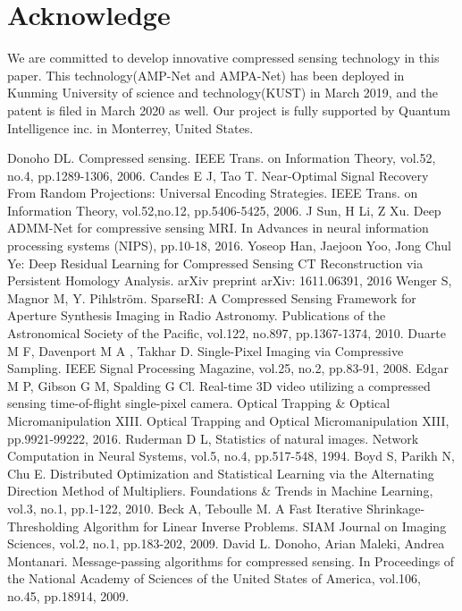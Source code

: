 \documentclass[conference]{IEEEtran}
\begin{document}
\section{Acknowledge}
We are committed to develop innovative compressed sensing technology in this paper. This technology(AMP-Net and AMPA-Net) has been deployed in Kunming University of science and technology(KUST) in March 2019, and the patent is filed in March 2020 as well. Our project is fully supported by Quantum Intelligence inc. in Monterrey, United States.
\begin{thebibliography}{1}
Donoho DL. Compressed sensing. IEEE Trans. on Information Theory, vol.52, no.4, pp.1289-1306, 2006.  
Candes E J, Tao T. Near-Optimal Signal Recovery From Random Projections: Universal Encoding Strategies. IEEE Trans. on Information Theory, vol.52,no.12, pp.5406-5425, 2006.
J Sun, H Li, Z Xu. Deep ADMM-Net for compressive sensing MRI. In Advances in neural information processing systems (NIPS), pp.10-18, 2016.
Yoseop Han, Jaejoon Yoo, Jong Chul Ye: Deep Residual Learning for Compressed Sensing CT Reconstruction via Persistent Homology Analysis. arXiv preprint arXiv: 1611.06391, 2016  
Wenger S, Magnor M, Y. Pihlström. SparseRI: A Compressed Sensing Framework for Aperture Synthesis Imaging in Radio Astronomy. Publications of the Astronomical Society of the Pacific, vol.122, no.897, pp.1367-1374, 2010.
Duarte M F, Davenport M A , Takhar D. Single-Pixel Imaging via Compressive Sampling. IEEE Signal Processing Magazine, vol.25, no.2, pp.83-91, 2008.
Edgar M P, Gibson G M, Spalding G Cl. Real-time 3D video utilizing a compressed sensing time-of-flight single-pixel camera. Optical Trapping \& Optical Micromanipulation XIII. Optical Trapping and Optical Micromanipulation XIII, pp.9921-99222, 2016.
Ruderman D L, Statistics of natural images. Network Computation in Neural Systems, vol.5, no.4, pp.517-548, 1994.
Boyd S, Parikh N, Chu E. Distributed Optimization and Statistical Learning via the Alternating Direction Method of Multipliers. Foundations \& Trends in Machine Learning, vol.3, no.1, pp.1-122, 2010.
Beck A, Teboulle M. A Fast Iterative Shrinkage-Thresholding Algorithm for Linear Inverse Problems. SIAM Journal on Imaging Sciences, vol.2, no.1, pp.183-202, 2009.
David L. Donoho, Arian Maleki, Andrea Montanari. Message-passing algorithms for compressed sensing. In Proceedings of the National Academy of Sciences of the United States of America, vol.106, no.45, pp.18914, 2009.

\end{thebibliography}
\end{document}

